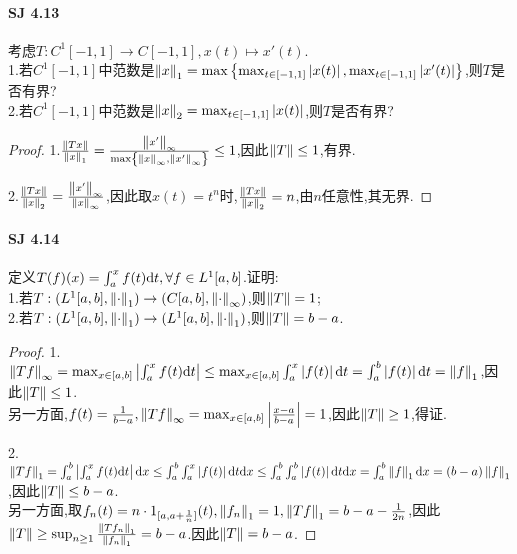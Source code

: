 \documentclass[UTF8]{article}
\begin{document}
\paragraph*{SJ 4.13}考虑$T:C^1[-1,1]\to C[-1,1], x(t)\mapsto x'(t)$.\\
1.若$C^1[-1,1]$中范数是$\left\|x\right\|_1=\max\left\{\max_{t\in [-1,1]}\left|x(t)\right|,\max_{t\in [-1,1]}\left|x'(t)\right|\right\}$,则$T$是否有界?\\
2.若$C^1[-1,1]$中范数是$\left\|x\right\|_2=\max_{t\in [-1,1]}\left|x(t)\right|$,则$T$是否有界?
\begin{proof}
    1.$\frac{\left\|Tx\right\|}{\left\|x\right\|_1}=\frac{\left\|x'\right\|_\infty}{\max\left\{\left\|x\right\|_\infty,\left\|x'\right\|_\infty\right\}}\leq 1$,因此$\left\|T\right\|\leq 1$,有界.

    2.$\frac{\left\|Tx\right\|}{\left\|x\right\|_2}=\frac{\left\|x'\right\|_\infty}{\left\|x\right\|_\infty}$,因此取$x(t)=t^n$时,$\frac{\left\|Tx\right\|}{\left\|x\right\|_2}=n$,由$n$任意性,其无界.
\end{proof}

\paragraph*{SJ 4.14}定义$T(f)(x)=\int_a^x f(t)\mathrm{d} t,\forall f\in L^1[a,b]$.证明:\\
1.若$T:(L^1[a,b],\left\|\cdot\right\|_1)\to (C[a,b],\left\|\cdot\right\|_\infty)$,则$\left\|T\right\|=1$;\\
2.若$T:(L^1[a,b],\left\|\cdot\right\|_1)\to (L^1[a,b],\left\|\cdot\right\|_1)$,则$\left\|T\right\|=b-a$.
\begin{proof}
    1.$\left\|Tf\right\|_\infty=\max_{x\in [a,b]}\left|\int_a^x f(t)\mathrm{d} t\right|\leq \max_{x\in [a,b]}\int_a^x \left|f(t)\right|\mathrm{d} t=\int_a^b \left|f(t)\right|\mathrm{d} t=\left\|f\right\|_1$,因此$\left\|T\right\|\leq 1$.\\
    另一方面,$f(t)=\frac{1}{b-a}, \left\|Tf\right\|_\infty=\max_{x\in [a,b]}\left|\frac{x-a}{b-a}\right|=1$,因此$\left\|T\right\|\geq 1$,得证.

    2.$\left\|Tf\right\|_1=\int_a^b\left|\int_a^xf(t)\mathrm{d} t\right|\mathrm{d} x\leq \int_a^b\int_a^x\left|f(t)\right|\mathrm{d} t\mathrm{d} x\leq \int_a^b\int_a^b\left|f(t)\right|\mathrm{d} t\mathrm{d} x=\int_a^b\left\|f\right\|_1\mathrm{d} x=(b-a)\left\|f\right\|_1$,因此$\left\|T\right\|\leq b-a$.\\
    另一方面,取$f_n(t)=n\cdot 1_{[a,a+\frac{1}{n}]}(t),\left\|f_n\right\|_1=1,\left\|Tf\right\|_1=b-a-\frac{1}{2n}$,因此$\left\|T\right\|\geq \sup_{n\geq 1}\frac{\left\|Tf_n\right\|_1}{\left\|f_n\right\|_1}=b-a$.因此$\left\|T\right\|=b-a$.
\end{proof}
\end{document}
